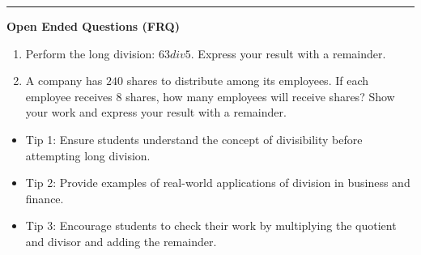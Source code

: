 \documentclass[10pt]{article}
\begin{document}
\vspace{-0.2cm}
\hrule
\vspace{0.2cm}
\textbf{\small Open Ended Questions (FRQ)}
\begin{enumerate}[label=\textbf{Q\arabic*.}, start=9, itemsep=5pt, topsep=0pt]

  \item \small Perform the long division: $63 div 5$. Express your result with a remainder. \vspace{2cm}

  \item \small A company has $240$ shares to distribute among its employees. If each employee receives $8$ shares, how many employees will receive shares? Show your work and express your result with a remainder. \vspace{2cm}

\end{enumerate}

\vfill

\begin{tcolorbox}[colback=blue!5, colframe=mainblue!50, title=\small \textbf{Chef's Tips}, fonttitle=\bfseries, bottom=1mm]
\begin{itemize}[noitemsep, topsep=2pt, leftmargin=0.5cm]
  \item \scriptsize Tip 1: Ensure students understand the concept of divisibility before attempting long division.\item \scriptsize Tip 2: Provide examples of real-world applications of division in business and finance.\item \scriptsize Tip 3: Encourage students to check their work by multiplying the quotient and divisor and adding the remainder.
\end{itemize}
\end{tcolorbox}
\end{document}

